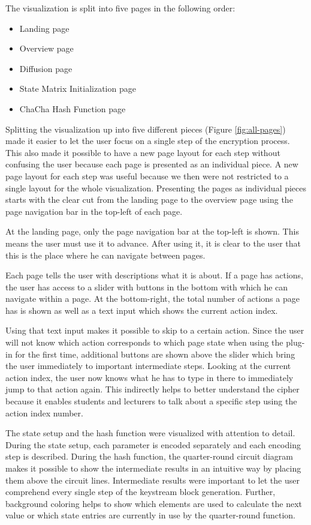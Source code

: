 \begin{enumerate}[label=(\labelenum{G}{{\arabic*}}), wide, labelwidth=!, labelindent=0pt]
     The visualization is split into five pages in the following order:
     \begin{itemize}
     \item Landing page
     \item Overview page
     \item Diffusion page
     \item State Matrix Initialization page
     \item ChaCha Hash Function page
     \end{itemize}
     Splitting the visualization up into five different pieces (Figure \ref{fig:all-pages}) made it easier to let the user focus on a single step of the encryption process. This also made it possible to have a new page layout for each step without confusing the user because each page is presented as an individual piece. A new page layout for each step was useful because we then were not restricted to a single layout for the whole visualization. Presenting the pages as individual pieces starts with the clear cut from the landing page to the overview page using the page navigation bar in the top-left of each page. 
     
     At the landing page, only the page navigation bar at the top-left is shown. This means the user must use it to advance. After using it, it is clear to the user that this is the place where he can navigate between pages.
     
     Each page tells the user with descriptions what it is about. If a page has actions, the user has access to a slider with buttons in the bottom with which he can navigate within a page. At the bottom-right, the total number of actions a page has is shown as well as a text input which shows the current action index.
     
     Using that text input makes it possible to skip to a certain action. Since the user will not know which action corresponds to which page state when using the plug-in for the first time, additional buttons are shown above the slider which bring the user immediately to important intermediate steps. Looking at the current action index, the user now knows what he has to type in there to immediately jump to that action again. This indirectly helps to better understand the cipher because it enables students and lecturers to talk about a specific step using the action index number.
     
     The state setup and the hash function were visualized with attention to detail. \\
     During the state setup, each parameter is encoded separately and each encoding step is described. During the hash function, the quarter-round circuit diagram makes it possible to show the intermediate results in an intuitive way by placing them above the circuit lines. Intermediate results were important to let the user comprehend every single step of the keystream block generation. Further, background coloring helps to show which elements are used to calculate the next value or which state entries are currently in use by the quarter-round function.
     

\end{enumerate}
